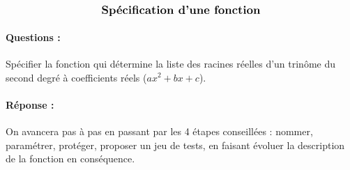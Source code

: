 \documentclass[11pt,a4paper]{article}
\begin{document}
\entete

\autoevaluation


$$\mbox{\textbf{\large Spécification d'une fonction}}$$

\paragraph{Questions :}
Spécifier la fonction qui détermine la liste des racines réelles d'un trinôme du 
second degré à  coefficients réels ($ax^2 + bx + c$).

\paragraph{Réponse :}
On avancera pas à pas en passant par les 4 étapes conseillées :
nommer, paramétrer, protéger, proposer un jeu de tests,
en faisant évoluer la description de la fonction en conséquence.

\noindent\framebox[\textwidth]{$\rule{0cm}{14cm}$}

\noindent\framebox[\textwidth]{$\rule{0cm}{22.5cm}$}

\end{document}
